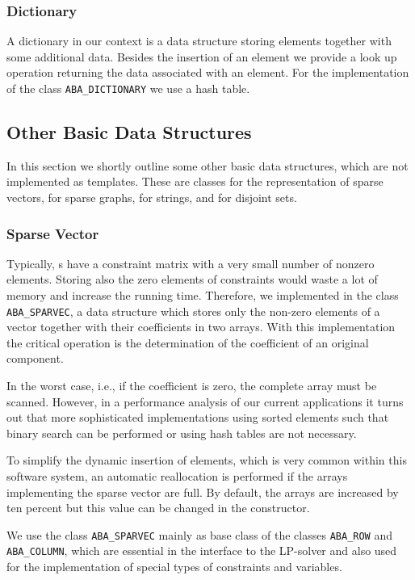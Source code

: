 \subsubsection{Dictionary}
\noindent
A dictionary in our context is a data structure storing elements together
with some additional data. Besides the insertion of an element we provide
a look up operation returning the data associated with an element. For
the implementation of the class 
{\tt ABA\_DICTIONARY} we use a hash table.

\subsection{Other Basic Data Structures}
\noindent
In this section we shortly outline some other basic data structures, which
are not implemented as templates. These are classes for the representation
of sparse vectors, for sparse graphs, for strings, and for disjoint sets.

\subsubsection{Sparse Vector}
\noindent
Typically, \mip s have a constraint matrix with a very small number
of nonzero elements. Storing also the zero elements
of constraints would waste a lot of memory and increase the 
running time. Therefore, we implemented in the 
class {\tt ABA\_SPARVEC},
a data structure which stores only the non-zero elements of a vector
together with their coefficients in two arrays. With this implementation
the critical operation is the determination of the coefficient of
an original component. 

In the worst case, i.e., if the coefficient is zero,
the complete array must be scanned. However, in a performance analysis 
of our current applications it turns out that more sophisticated
implementations using sorted elements such that binary search can
be performed or using hash tables are not necessary.

To simplify the dynamic insertion of elements, which is very common
within this software system, an automatic reallocation is performed
if the arrays implementing the sparse vector are full. 
By default, the arrays are increased
by ten percent but this value can be changed in the constructor.

We use the class {\tt ABA\_SPARVEC} mainly 
as base class of the classes {\tt ABA\_ROW} and {\tt ABA\_COLUMN},
which are essential in the interface to the LP-solver and
also used for the implementation of special types of constraints
and variables.


